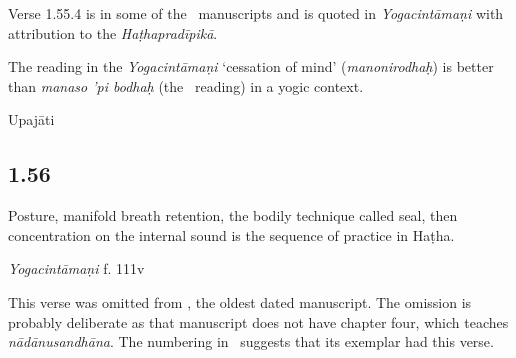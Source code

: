 \begin{ekdosis}
\begin{testimonia}[hp01_055_4]
\end{testimonia}

\begin{philcomm}[hp01_055_4]
Verse 1.55.4 is in some of the \textdelta\ manuscripts and is quoted in \emph{Yogacintāmaṇi} with attribution to the \emph{Haṭhapradīpikā}.

The reading in the \emph{Yogacintāmaṇi} `cessation of mind' (\emph{manonirodhaḥ}) is better than \emph{manaso 'pi bodhaḥ} (the \textdelta\ reading) in a yogic context.
\end{philcomm}

\begin{metre}[hp01_055_4]
Upajāti
\end{metre}

\subsection*{1.56}
\begin{translation}[hp01_056]
Posture, manifold breath retention, the bodily technique called seal, then concentration on the internal sound is the sequence of practice in Haṭha.
\end{translation}

\begin{sources}[hp01_056]
\end{sources}

\begin{testimonia}[hp01_056]
\emph{Yogacintāmaṇi} f. 111v

\begin{versinnote}
\end{versinnote}

\end{testimonia}

\begin{philcomm}[hp01_056]
This verse was omitted from \etaOne, the oldest dated manuscript. The omission is probably deliberate as that manuscript does not have chapter four, which teaches \emph{nādānusandhāna}. The numbering in \etaOne\ suggests that its exemplar had this verse.


\end{philcomm}
\end{ekdosis}
